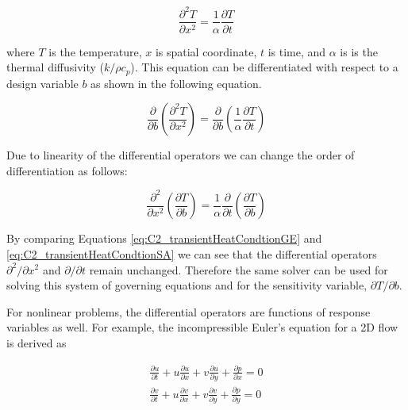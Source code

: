 \begin{equation}\label{eq:C2_transientHeatCondtionGE}
    \frac{\partial^2 T}{\partial x^2} = \frac{1}{\alpha} \frac{\partial T}{\partial t}
\end{equation}

where $T$ is the temperature, $x$ is spatial coordinate, $t$ is time, and $\alpha$ is is the thermal diffusivity ($k/\rho c_p$). This equation can be differentiated with respect to a design variable $b$ as shown in the following equation.

\begin{equation*}
    \frac{\partial}{\partial b}
    \left( \frac{\partial^2 T}{\partial x^2}\right) = 
    \frac{\partial}{\partial b}
    \left( \frac{1}{\alpha} \frac{\partial T}{\partial t}\right)
\end{equation*}

Due to linearity of the differential operators we can change the order of differentiation as follows:

\begin{equation}\label{eq:C2_transientHeatCondtionSA}
    \frac{\partial^2}{\partial x^2}
    \left( \frac{\partial T}{\partial b} \right) = 
    \frac{1}{\alpha} \frac{\partial}{\partial t}
    \left( \frac{\partial T}{\partial b}\right)
\end{equation}

By comparing Equations \eqref{eq:C2_transientHeatCondtionGE} and \eqref{eq:C2_transientHeatCondtionSA} we can see that the differential operators $\partial^2 /\partial x^2$ and $\partial /\partial t$ remain unchanged. Therefore the same solver can be used for solving this system of governing equations and for the sensitivity variable, $\partial T/\partial b$.

For nonlinear problems, the differential operators are functions of response variables as well. For example, the incompressible Euler's equation for a 2D flow is derived as

\begin{subequations}\label{eq:C2_eulerEquations}
\begin{gather}
    \frac{\partial u}{\partial t} +
    u \frac{\partial u}{\partial x} + v \frac{\partial u}{\partial y} +
    \frac{\partial p}{\partial x} = 0 
    \\
    \frac{\partial v}{\partial t} +
    u \frac{\partial v}{\partial x} + v \frac{\partial v}{\partial y} +
    \frac{\partial p}{\partial y} = 0
\end{gather}
\end{subequations}

